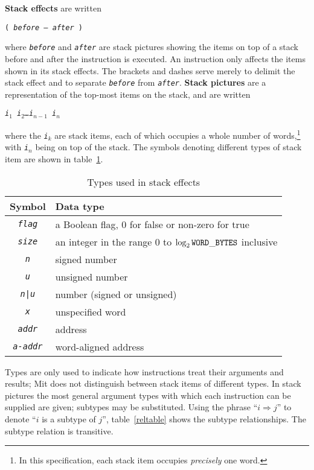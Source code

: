 \documentclass[a4paper]{article}
\newcommand{\spic}[1]{\texttt{\textsl{#1\/}}}
\begin{document}
{\bf Stack effects} are written

\centerline{\tt ( \spic{before — after} )}

\noindent where \spic{before} and \spic{after} are stack pictures showing the items on top
of a stack before and after the instruction is executed.
An instruction only affects the items shown in its
stack effects. The brackets and dashes serve merely to delimit the stack
effect and to separate \spic{before} from \spic{after}. {\bf Stack pictures}
are a representation of the top-most items on the stack, and are written

\centerline{\spic{i$_1$ i$_2$\dots i$_{n-1}$ i$_n$}}

\noindent where the \spic{i$_k$} are stack items, each of which occupies a whole number of words,\footnote{In this specification, each stack item occupies \emph{precisely} one word.} with \spic{i$_n$} being on top of the stack. The symbols denoting different types of stack item are shown in table~\ref{typetable}.

\begin{table}[htbp]
\begin{center}
\begin{tabular}{cl} \toprule
\bf Symbol & \bf Data type \\ \midrule
\spic{flag} & a Boolean flag, $0$ for false or non-zero for true \\
\spic{size} & an integer in the range $0$ to $\log_2{\tt WORD\_BYTES}$ inclusive \\
\spic{n} & signed number \\
\spic{u} & unsigned number \\
\spic{n{\tt |}u} & number (signed or unsigned) \\
\spic{x} & unspecified word \\
\spic{addr} & address \\
\spic{a-addr} & word-aligned address \\
\bottomrule
\end{tabular}
\caption{\label{typetable}Types used in stack effects}
\end{center}
\end{table}

Types are only used to indicate how instructions treat their arguments and
results; Mit does not distinguish between stack items of different types. In
stack pictures the most general argument types with which each instruction can
be supplied are given; subtypes may be substituted. Using the phrase ``$i
\Rightarrow j$'' to denote ``$i$\/ is a subtype of $j$\/'', table~\ref{reltable}
shows the subtype relationships. The subtype relation is transitive.
\end{document}
